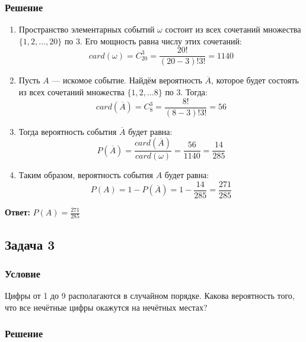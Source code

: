 \documentclass[14pt]{article}
\begin{document}
    \subsubsection*{Решение}

    \begin{enumerate}[wide, labelwidth=!, labelindent=0pt]
        \item Пространство элементарных событий $\omega$ состоит из всех сочетаний множества $\{1, 2, ..., 20\}$ по $3$.
        Его мощность равна числу этих сочетаний:
        \[card (\omega)= C_{20}^3 = \frac{20!}{(20 - 3)!3!} = 1140\]
        \item Пусть $A$ --- искомое событие. Найдём вероятность $\overline{A}$, которое будет состоять из всех сочетаний множества $\{1,2,...8\}$ по $3$.
        Тогда:
        \[card (\overline{A}) = C_{8}^3 = \frac{8!}{(8 - 3)!3!} = 56\]
        \item Тогда вероятность события $\overline{A}$ будет равна:
        \[P(\overline{A}) = \frac{card(\overline{A})}{card(\omega)} = \frac{56}{1140} = \frac{14}{285}\]
        \item Таким образом, вероятность события $A$ будет равна:
        \[P(A) = 1 - P(\overline{A}) = 1 - \frac{14}{285} = \frac{271}{285}\]
    \end{enumerate}
    \hspace{290pt}\textbf{Ответ:} $P(A) = \frac{271}{285}$

    \newpage

    \subsection*{Задача 3}
    \subsubsection*{Условие}

    Цифры от 1 до 9 располагаются в случайном порядке.
    Какова вероятность того, что все нечётные цифры окажутся на нечётных местах?

    \subsubsection*{Решение}
\end{document}
